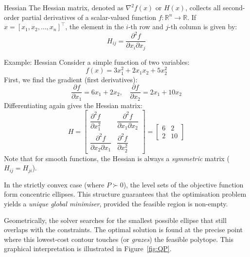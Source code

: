 \begin{defnbox}{Hessian}
	The Hessian matrix, denoted as $\nabla^2 f(x)$ or $H(x)$, collects all second-order partial derivatives of a scalar-valued function $f: \mathbb{R}^n \to \mathbb{R}$. If $x = [x_1, x_2, \dots, x_n]^\top$, the element in the $i$-th row and $j$-th column is given by:
	\begin{equation*}
		H_{ij} = \dfrac{\partial^2 f}{\partial x_i \partial x_j}
	\end{equation*}
\end{defnbox}

\begin{examplebox}{Example: Hessian}
	Consider a simple function of two variables:
	\[
	f(x) = 3x_1^2 + 2x_1 x_2 + 5x_2^2
	\]
	First, we find the gradient (first derivatives):
	\[
	\dfrac{\partial f}{\partial x_1} = 6x_1 + 2x_2, \quad \dfrac{\partial f}{\partial x_2} = 2x_1 + 10x_2
	\]
	Differentiating again gives the Hessian matrix:
	\[
	H = \begin{bmatrix}
		\dfrac{\partial^2 f}{\partial x_1^2} & \dfrac{\partial^2 f}{\partial x_1 \partial x_2} \\[12pt]
		\dfrac{\partial^2 f}{\partial x_2 \partial x_1} & \dfrac{\partial^2 f}{\partial x_2^2}
	\end{bmatrix}
	= \begin{bmatrix}
		6 & 2 \\
		2 & 10
	\end{bmatrix}
	\]
	Note that for smooth functions, the Hessian is always a \emph{symmetric} matrix ($H_{ij} = H_{ji}$).
\end{examplebox}



In the strictly convex case (where $P \succ 0$), the level sets of the objective function form concentric ellipses. This structure guarantees that the optimisation problem yields a \emph{unique global minimiser}, provided the feasible region is non-empty. 

Geometrically, the solver searches for the smallest possible ellipse that still overlaps with the constraints. The optimal solution is found at the precise point where this lowest-cost contour touches (or \emph{grazes}) the feasible polytope. This graphical interpretation is illustrated in Figure~\ref{fig:QP}.

